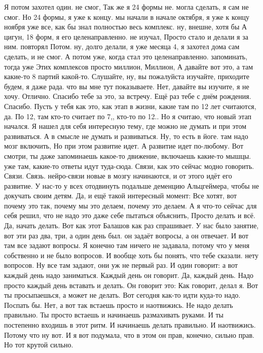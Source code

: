 Я потом захотел один.
не смог, Так же я 24 формы не.
могла сделать, я сам не смог.
Но 24 формы, я уже к концу. мы начали в начале октября, я уже к концу ноября уже все, как бы знал полностью весь комплекс. ну, внешне, хотя бы А цигун, 18 форм, я его целенаправленно.
не изучал, Просто стало и делали я за ним.
повторял Потом. ну, долго делали, я уже месяца 4, я захотел дома сам сделать, и не смог. А потом уже, когда стал это целенаправленно.
запоминать, тогда уже Этих комплексов просто миллион, Миллион, А давайте вот это, а там какие-то 8 партий какой-то. Слушайте, ну, вы пожалуйста изучайте, приходите будем, я даже рада.
что вы мне тут показываете.
Нет, давайте вы изучите, я не хочу.
Отлично.
Спасибо тебе за это, за встречу.
Ещё раз тебе с днём рождения.
Спасибо.
Пусть у тебя как это, как этап в жизни, какие там по 12 лет считаются, да.
По 12, там кто-то считает по 7,, кто-то по 12..
Но я считаю, что новый этап начался. Я нашел для себя интересную тему, где можно не думать и при этом развиваться.
А в смысле не думать и развиваться.
Ну, то есть в йоге. там надо мозг включить, Но при этом развитие идет.
А развитие идет по-любому.
Вот смотри, ты даже запоминаешь какое-то движение, включаешь какие-то мышцы. уже там, какие-то ответы идут туда-сюда.
Связи, как это сейчас модно говорить.
Связи.
Связь.
нейро-связи новые в мозгу начинаются, и от этого идёт его развитие.
У нас-то у всех отодвинуть подальше деменцию Альцгеймера, чтобы не докучать своим детям.
Да, и ещё такой интересный момент: Все хотят, вот почему это так, почему мы это делаем, почему это делаем. А я что-то сейчас для себя решил, что не надо это даже себе пытаться объяснить, Просто делать и всё.
Да, начать делать.
Вот как этот Балашов как раз спрашивает.
У нас было занятие, вот эти раз два, три, а один день был. он задаёт вопросы, а он отвечает.
И вот там все задают вопросы.
Я конечно там ничего не задавала, потому что у меня собственно и не было вопросов.
И вообще хоть бы понять, что тебе сказали. нету вопросов.
Ну все там задают, они уж не первый раз.
И один говорит: а вот каждый день надо заниматься.
Каждый день он говорит.
Да, каждый день.
Надо просто каждый день вставать и делать.
Он говорит это:
Как говорит, делал я.
Вот ты просыпаешься, а может не делать.
Вот сегодня как-то идти куда-то надо.
Поспать бы.
Нет, а вот так встаешь просто и наотвижись.
Не надо делать правильно.
Ты просто встаешь и начинаешь размахивать руками.
И ты постепенно входишь в этот ритм.
И начинаешь делать правильно.
И наотвижись.
Потому что ну вот.
И я вот подумала, что в этом он прав, конечно, сильно прав.
Но тот крутой сильно.
